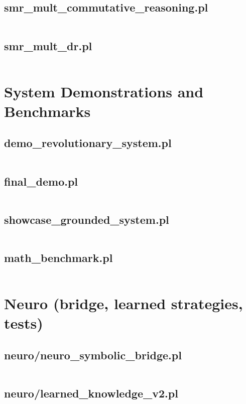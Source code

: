 \documentclass{article}
\begin{document}
\subsection{smr\_mult\_commutative\_reasoning.pl}
\inputminted{prolog}{smr_mult_commutative_reasoning.pl}
\subsection{smr\_mult\_dr.pl}
\inputminted{prolog}{smr_mult_dr.pl}

\section{System Demonstrations and Benchmarks}
\subsection{demo\_revolutionary\_system.pl}
\inputminted{prolog}{demo_revolutionary_system.pl}
\subsection{final\_demo.pl}
\inputminted{prolog}{final_demo.pl}
\subsection{showcase\_grounded\_system.pl}
\inputminted{prolog}{showcase_grounded_system.pl}
\subsection{math\_benchmark.pl}
\inputminted{prolog}{math_benchmark.pl}

\section{Neuro (bridge, learned strategies, tests)}
\subsection{neuro/neuro\_symbolic\_bridge.pl}
\inputminted{prolog}{neuro/neuro_symbolic_bridge.pl}
\subsection{neuro/learned\_knowledge\_v2.pl}
\inputminted{prolog}{neuro/learned_knowledge_v2.pl}
\end{document}
